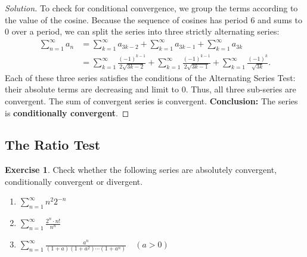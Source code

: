 \documentclass[11pt]{article}
\theoremstyle{definition}
\newtheorem{exercise}{Exercise}[section]
\newenvironment{solution}{\begin{proof}[Solution]}{\end{proof}}
\begin{document}
\begin{solution}
To check for conditional convergence, we group the terms according to the value of the cosine. Because the sequence of cosines has period 6 and sums to 0 over a period, we can split the series into three strictly alternating series:
\begin{align*}
\sum_{n=1}^{\infty} a_n &= \sum_{k=1}^{\infty} a_{3k-2} + \sum_{k=1}^{\infty} a_{3k-1} + \sum_{k=1}^{\infty} a_{3k} \\
&= \sum_{k=1}^{\infty} \frac{(-1)^{k-1}}{2\sqrt{3k-2}} + \sum_{k=1}^{\infty} \frac{(-1)^{k-1}}{2\sqrt{3k-1}} + \sum_{k=1}^{\infty} \frac{(-1)^{k}}{\sqrt{3k}}.
\end{align*}
Each of these three series satisfies the conditions of the Alternating Series Test: their absolute terms are decreasing and limit to 0. Thus, all three sub-series are convergent. The sum of convergent series is convergent.
\textbf{Conclusion:} The series is \textbf{conditionally convergent}.
\end{solution}

\subsection{The Ratio Test}

\begin{exercise}
Check whether the following series are absolutely convergent, conditionally convergent or divergent.
\begin{enumerate}
    \item $\displaystyle \sum_{n=1}^{\infty} n^2 2^{-n}$
    \item $\displaystyle \sum_{n=1}^{\infty} \frac{2^n \cdot n!}{n^n}$
    \item $\displaystyle \sum_{n=1}^{\infty} \frac{a^n}{(1+a)(1+a^2)\cdots(1+a^n)} \quad (a > 0)$
\end{enumerate}
\end{exercise}
\end{document}

